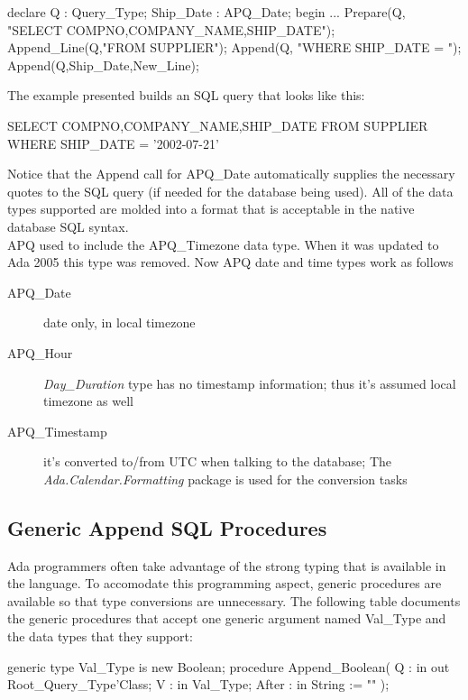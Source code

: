 \documentclass[english,letterpaper]{book}
\begin{document}
\begin{Example}
declare
   Q :         Query_Type;
   Ship_Date : APQ_Date;
begin
   ...
   Prepare(Q,    "SELECT COMPNO,COMPANY_NAME,SHIP_DATE");
   Append_Line(Q,"FROM SUPPLIER");
   Append(Q,     "WHERE SHIP_DATE = ");
   Append(Q,Ship_Date,New_Line);
\end{Example}

The example presented builds an SQL query that looks like this:

\begin{SQL}
SELECT COMPNO,COMPANY_NAME,SHIP_DATE
FROM SUPPLIER
WHERE SHIP_DATE = '2002-07-21'
\end{SQL}

Notice that the Append call for APQ\_Date automatically supplies the
necessary quotes to the SQL query (if needed for the database being
used). All of the data types supported are molded into a format that
is acceptable in the native database SQL syntax. \\


APQ used to include the APQ\_Timezone data type. When it was updated to Ada 2005
this type was removed. Now APQ date and time types work as follows

\begin{description}
	\item[APQ\_Date] date only, in local timezone
	\item[APQ\_Hour] \emph{Day\_Duration} type has no timestamp information; thus it's assumed local timezone as well
	\item[APQ\_Timestamp] it's converted to/from UTC when talking to the database; The \emph{Ada.Calendar.Formatting} package is used for the conversion tasks
\end{description}


\subsection{Generic Append SQL Procedures}

Ada programmers often take advantage of the strong typing that
is available in the language. To accomodate this programming aspect,
generic procedures are available so that type conversions
are unnecessary. The following table documents the generic procedures
that accept one generic argument named Val\_Type and the data
types that they support:

\begin{Code}
generic
   type Val_Type is new Boolean;
procedure Append_Boolean(
   Q :     in out Root_Query_Type'Class;
   V :     in     Val_Type;
   After : in     String := ""
);
\end{Code}
\end{document}
